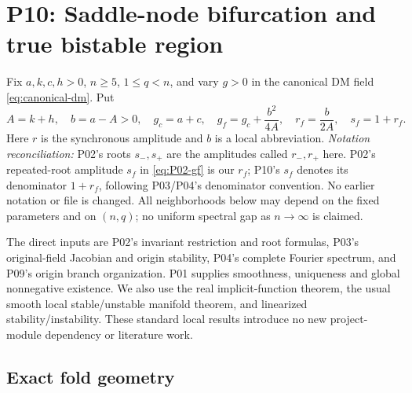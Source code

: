 \section{P10: Saddle-node bifurcation and true bistable region}
\label{sec:P10}

Fix $a,k,c,h>0$, $n\ge5$, $1\le q<n$, and vary $g>0$ in the
canonical DM field \eqref{eq:canonical-dm}. Put
\begin{equation}
 A=k+h,\quad b=a-A>0,\quad g_c=a+c,\quad
 g_f=g_c+\frac{b^2}{4A},\quad r_f=\frac b{2A},\quad s_f=1+r_f.
 \label{eq:P10-data}
\end{equation}
Here $r$ is the synchronous amplitude and $b$ is a local abbreviation.
\emph{Notation reconciliation:} P02's roots $s_-,s_+$ are the amplitudes
called $r_-,r_+$ here. P02's repeated-root amplitude $s_f$ in
\eqref{eq:P02-gf} is our $r_f$; P10's $s_f$ denotes its denominator
$1+r_f$, following P03/P04's denominator convention. No earlier notation
or file is changed. All neighborhoods below may depend on the fixed
parameters and on $(n,q)$; no uniform spectral gap as $n\to\infty$ is claimed.

The direct inputs are P02's invariant restriction and root formulas,
P03's original-field Jacobian and origin stability, P04's complete
Fourier spectrum, and P09's origin branch organization. P01 supplies
smoothness, uniqueness and global nonnegative existence. We also use
the real implicit-function theorem, the usual smooth local stable/unstable
manifold theorem, and linearized stability/instability. These standard
local results introduce no new project-module dependency or literature work.

\subsection{Exact fold geometry}
\label{slot:P10-1}

